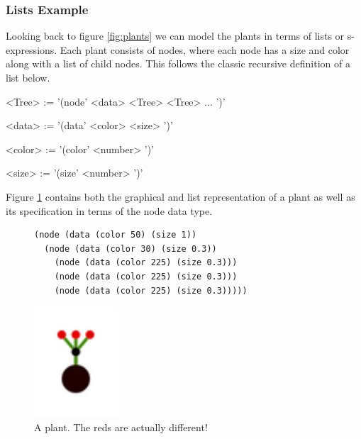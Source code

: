 \documentclass[a4paper,10pt]{article}
\begin{document}
\subsubsection{Lists Example}
Looking back to figure \ref{fig:plants} we can model the plants in terms of lists or s-expressions.  Each plant consists of nodes, where each node has a size and color along with a list of child nodes.  This follows the classic recursive definition of a list below.   
\begin{grammar}
<Tree> := '(node' <data> <Tree> <Tree> ... ')'

<data> := '(data' <color> <size> ')'

<color> := '(color' <number> ')'

<size> := '(size' <number> ')'
\end{grammar}
Figure \ref{fig:plant} contains both the graphical and list representation of a plant as well as its specification in terms of the node data type.
\begin{figure}[h]
\begin{verbatim}
(node (data (color 50) (size 1))
  (node (data (color 30) (size 0.3))
    (node (data (color 225) (size 0.3)))
    (node (data (color 225) (size 0.3)))
    (node (data (color 225) (size 0.3)))))
\end{verbatim}
\begin{center}
\includegraphics[scale=1.0]{plant.pdf}
\end{center}
\label{fig:plant}
\caption{A plant.  The reds are actually different!}
\end{figure}
\end{document}
